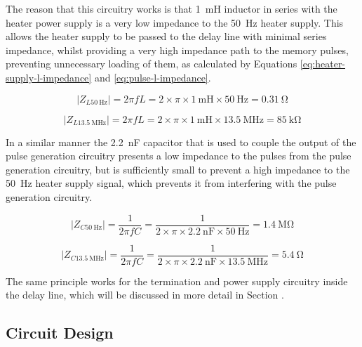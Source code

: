The reason that this circuitry works is that \SI{1}{\milli\henry} inductor in series with the heater power supply is a very low impedance to the \SI{50}{\hertz} heater supply. This allows the heater supply to be passed to the delay line with minimal series impedance, whilst providing a very high impedance path to the memory pulses, preventing unnecessary loading of them, as calculated by Equations \ref{eq:heater-supply-l-impedance} and \ref{eq:pulse-l-impedance}.

\begin{equation}
	| Z_{L\SI{50}{\hertz}} | = 2 \pi f L = 2 \times \pi \times \SI{1}{\milli\henry} \times \SI{50}{\hertz} = \SI{0.31}{\ohm} \label{eq:heater-supply-l-impedance} 
\end{equation}

\begin{equation}
| Z_{L\SI{13.5}{\mega\hertz}} | = 2 \pi f L = 2 \times \pi \times \SI{1}{\milli\henry} \times \SI{13.5}{\mega\hertz} = \SI{85}{\kilo\ohm} \label{eq:pulse-l-impedance}
\end{equation}

In a similar manner the \SI{2.2}{\nano\farad} capacitor that is used to couple the output of the pulse generation circuitry presents a low impedance to the pulses from the pulse generation circuitry, but is sufficiently small to prevent a high impedance to the \SI{50}{\hertz} heater supply signal, which prevents it from interfering with the pulse generation circuitry.

\begin{equation}
| Z_{C\SI{50}{\hertz}} | = \frac{1}{2 \pi f C} = \frac{1}{2 \times \pi \times \SI{2.2}{\nano\farad} \times \SI{50}{\hertz}} = \SI{1.4}{\mega\ohm} \label{eq:heater-supply-c-impedance} 
\end{equation}


\begin{equation}
| Z_{C\SI{13.5}{\mega\hertz}} | = \frac{1}{2 \pi f C} = \frac{1}{2 \times \pi \times \SI{2.2}{\nano\farad} \times \SI{13.5}{\mega\hertz}} = \SI{5.4}{\ohm} \label{eq:heater-supply-c-impedance} 
\end{equation}

The same principle works for the termination and power supply circuitry inside the delay line, which will be discussed in more detail in Section .

\subsection{Circuit Design}

